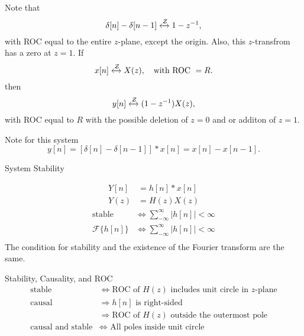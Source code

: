 \begin{frame}
    {
        Note that
        \begin{equation*}
            \delta[n] - \delta[n-1] \xleftrightarrow{\mathcal{Z}} 1-z^{-1},
        \end{equation*}
        with ROC equal to the entire $z$-plane, except the origin. Also, this $z$-transfrom has a zero at $z=1$. If
        \begin{equation}
            x[n] \xleftrightarrow{\mathcal{Z}} X(z), \quad \text{with ROC~} = R.
        \end{equation}
        then
        \begin{equation}
            y[n] \xleftrightarrow{\mathcal{Z}} (1-z^{-1})X(z),
        \end{equation}
        with ROC equal to $R$ with the possible deletion of $z=0$ and or additon of $z=1$.\par

        Note for this system
        \begin{equation}
            y[n] = [\delta[n] - \delta[n-1] ]\ast x[n] = x[n] - x[n-1].
        \end{equation}

    }
\end{frame}




\begin{frame}{System Stability}
    \begin{center}
        
    \end{center}
    \begin{align*}
        Y[n] &= h[n]\ast x[n]\\
        Y(z) &= H(z)X(z)
    \end{align*}
    \pause
    \begin{align*}
        \text{stable} &\Leftrightarrow \sum_{-\infty}^{\infty} |h[n]| < \infty\\
        \mathcal{F}\{h[n]\}&\Leftrightarrow \sum_{-\infty}^{\infty} |h[n]| < \infty\\
    \end{align*}
    \pause
    The condition for stability and the existence of the Fourier transform are the same.
\end{frame}

\begin{frame}{Stability, Causality, and ROC}
    \begin{align*}
         \text{stable} &\Leftrightarrow \text{ROC of $H(z)$ includes unit circle in $z$-plane}\\
         \text{causal} &\Rightarrow \text{$h[n]$ is right-sided}\\
         &\Rightarrow \text{ROC of $H(z)$ outside the outermost pole}\\
         \text{causal and stable} &\Leftrightarrow \text{ All poles inside unit circle}
    \end{align*}
\end{frame}

